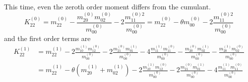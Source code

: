 This time, even the zeroth order moment differs from the cumulant.
\begin{equation}
  K_{22}^{(0)}
  = m_{22}^{(0)} - \frac{ m_{20}^{(0)} m_{02}^{(0)} }{m_{00}^{(0)}} - 2\frac{ m_{11}^{(0)2}  }{m_{00}^{(0)}} = m_{22}^{(0)} - \theta m_{00}^{(0)} - 2\frac{ m_{11}^{(0)2}  }{m_{00}^{(0)}}
 \end{equation}
and the first order terms are
\begin{equation}
  \begin{aligned}
    K_{22}^{(1)}
    & = m_{22}^{(1)}
      - 2\frac{ m_{10}^{(1)} m_{12}^{(0)} }{m_{00}^{(0)}}
      - 2\frac{ m_{21}^{(0)} m_{01}^{(1)} }{m_{00}^{(0)}}
      - 4\frac{ m_{11}^{(1)} m_{11}^{(0)} }{m_{00}^{(0)}}
      - \frac{ m_{20}^{(0)} m_{02}^{(1)} }{m_{00}^{(0)}}
      - \frac{ m_{20}^{(1)} m_{02}^{(0)} }{m_{00}^{(0)}}
    \\& = m_{22}^{(1)}
      - \theta (m_{20}^{(1)} + m_{02}^{(1)})
      - 2\frac{ m_{10}^{(1)} m_{12}^{(0)} }{m_{00}^{(0)}}
      - 2\frac{ m_{21}^{(0)} m_{01}^{(1)} }{m_{00}^{(0)}}
      - 4\frac{ m_{11}^{(1)} m_{11}^{(0)} }{m_{00}^{(0)}}
  \end{aligned}
 \end{equation}

